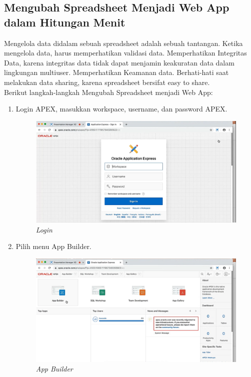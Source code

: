 \subsection{Mengubah Spreadsheet Menjadi Web App dalam Hitungan Menit}
Mengelola data didalam sebuah spreadsheet adalah sebuah tantangan. Ketika mengelola data, harus memperhatikan validasi data. Memperhatikan Integritas Data, karena integritas data tidak dapat menjamin keakuratan data dalam lingkungan multiuser. Memperhatikan Keamanan data. Berhati-hati saat melakukan data sharing, karena spreadsheet bersifat easy to share.\\
Berikut langkah-langkah Mengubah Spreadsheet menjadi Web App:
\begin{enumerate}
 \item Login APEX, masukkan workspace, username, dan password APEX.
 \begin{figure}[H]
    \centering
    \includegraphics[scale=0.5]{figures/2}
    \caption{\textit{Login}}
    \label{Login}
\end{figure}
 \item Pilih menu App Builder.
 \begin{figure}[H]
    \centering
    \includegraphics[scale=0.5]{figures/3}
    \caption{\textit{App Builder}}

\end{figure}
\end{enumerate}
